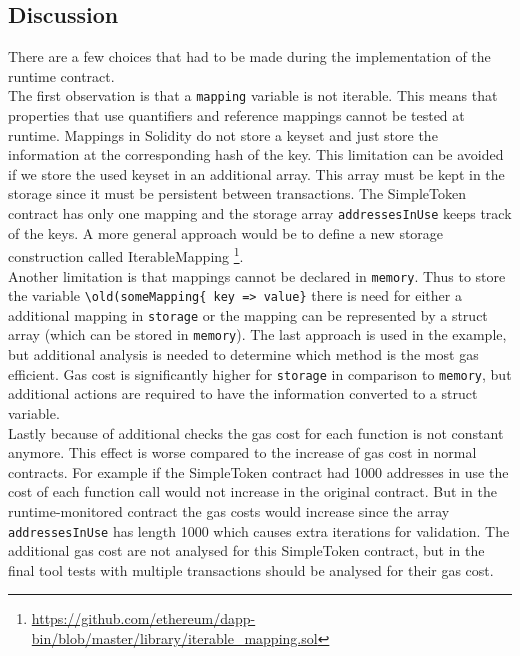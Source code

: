\documentclass[a4paper]{article}
\begin{document}
\subsection{Discussion}
There are a few choices that had to be made during the implementation of the runtime contract. \\
The first observation is that a \texttt{mapping} variable is not iterable. This means that properties that use quantifiers and reference mappings cannot be tested at runtime. Mappings in Solidity do not store a keyset and just store the information at the corresponding hash of the key.  This limitation can be avoided if we store the used keyset in an additional array. This array must be kept in the storage since it must be persistent between transactions. The SimpleToken contract has only one mapping and the storage array \texttt{addressesInUse} keeps track of the keys. A more general approach would be to define a new storage construction called IterableMapping \footnote{\url{https://github.com/ethereum/dapp-bin/blob/master/library/iterable_mapping.sol}}. \\
Another limitation is that mappings cannot be declared in \texttt{memory}. Thus to store the variable \texttt{\textbackslash old(someMapping\{ key => value\}} there is  need for either a additional mapping in \texttt{storage} or the mapping can be represented by a struct array (which can be stored in \texttt{memory}). The last approach is used in the example, but additional analysis is needed to determine which method is the most gas efficient. Gas cost is significantly higher for \texttt{storage} in comparison to \texttt{memory}, but additional actions are required to have the information converted to a struct variable.\\
Lastly because of additional checks the gas cost for each function is not constant anymore. This effect is worse compared to the increase of gas cost in normal contracts. For example if the SimpleToken contract had 1000 addresses in use the cost of each function call would not increase in the original contract. But in the runtime-monitored contract the gas costs would increase since the array \texttt{addressesInUse} has length 1000 which causes extra iterations for validation. The additional gas cost are not analysed for this SimpleToken contract, but in the final tool tests with multiple transactions should be analysed for their gas cost.
\end{document}
